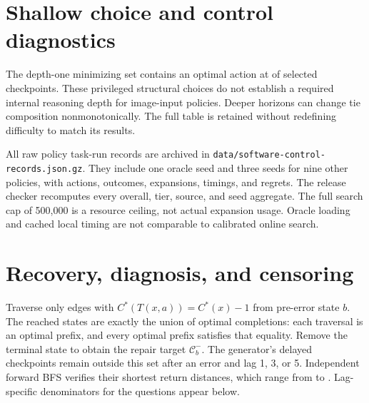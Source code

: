 \begin{table}[t]
\centering\small
\caption{A prefix-only software control returns the first conflict if
it appears within $k$ executed operations, otherwise ``all legal.''
The denominator is all \ContinuationCount{} continuation questions.}

\end{table}

\section{Shallow choice and control diagnostics}
\begin{table}[t]
\centering\small
\caption{Measured finite-horizon choice sets for all \NextActionCount{} next-action
questions. Any/all refer to optimistic/pessimistic ties; uniform tie
correctness is an exact average, not a sampled policy result.}

\end{table}
The depth-one minimizing set contains an optimal action at
\DepthOneContainsOptimal{} of \NextActionCount{} selected checkpoints.
These privileged structural choices do not establish a required internal
reasoning depth for image-input policies.
Deeper horizons can change tie composition nonmonotonically. The full
table is retained without redefining difficulty to match its results.

\begin{table}[t]
\centering\small
\caption{Structural policy completion by operation-length bin.
Each nonoracle policy has three tie-order seeds per episode.}

\end{table}
All \RawPolicyRuns{} raw policy task-run records are archived in
\texttt{data/software-control-records.json.gz}. They include one oracle
seed and three seeds for nine other policies, with actions, outcomes,
expansions, timings, and regrets. The release checker recomputes every
overall, tier, source, and seed aggregate. The full search cap of
500,000 is a resource ceiling, not actual expansion usage. Oracle loading
and cached local timing are not comparable to calibrated online search.

\section{Recovery, diagnosis, and censoring}
Traverse only edges with $C^*(T(x,a))=C^*(x)-1$ from pre-error state
$b$. The reached states are exactly the union of optimal completions:
each traversal is an optimal prefix, and every optimal prefix satisfies
that equality. Remove the terminal state to obtain the repair target
$\mathcal C_b^{-}$. The generator's delayed checkpoints remain outside
this set after an error and lag 1, 3, or 5. Independent forward BFS
verifies their shortest return distances, which range from
\RepairMin{} to \RepairMax{}. Lag-specific denominators for the
\RepairCount{} questions appear below.

